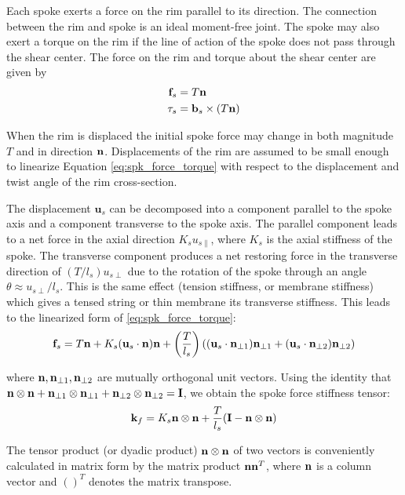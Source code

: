 \documentclass[\rootdir/thesis.tex]{subfiles}
\begin{document}
Each spoke exerts a force on the rim parallel to its direction. The connection between the rim and spoke is an ideal moment-free joint. The spoke may also exert a torque on the rim if the line of action of the spoke does not pass through the shear center. The force on the rim and torque about the shear center are given by
\begin{subequations}
\label{eq:spk_force_torque}
\begin{align}
\mathbf{f}_s &= T\mathbf{n}\\
\tau_s &= \mathbf{b}_s \times ( T\mathbf{n} )
\end{align}
\end{subequations}

When the rim is displaced the initial spoke force may change in both magnitude $T$ and in direction $\mathbf{n}$. Displacements of the rim are assumed to be small enough to linearize Equation \eqref{eq:spk_force_torque} with respect to the displacement and twist angle of the rim cross-section.

The displacement $\mathbf{u}_s$ can be decomposed into a component parallel to the spoke axis and a component transverse to the spoke axis. The parallel component leads to a net force in the axial direction $K_s u_{s\parallel}$, where $K_s$ is the axial stiffness of the spoke. The transverse component produces a net restoring force in the transverse direction of $(T/l_s) u_{s\perp}$ due to the rotation of the spoke through an angle $\theta \approx u_{s\perp}/l_s$. This is the same effect (tension stiffness, or membrane stiffness) which gives a tensed string or thin membrane its transverse stiffness. This leads to the linearized form of \eqref{eq:spk_force_torque}:
\begin{equation}
\label{eq:fs_us}
\mathbf{f}_s = T\mathbf{n} +
    K_s (\mathbf{u}_s \cdot \mathbf{n})\mathbf{n} +
    \left(\frac{T}{l_s}\right) \left((\mathbf{u}_s \cdot \mathbf{n}_{\perp 1} ) \mathbf{n}_{\perp 1} +
                                     (\mathbf{u}_s \cdot \mathbf{n}_{\perp 2} ) \mathbf{n}_{\perp 2} \right)
\end{equation}

where $\mathbf{n},\mathbf{n}_{\perp 1},\mathbf{n}_{\perp 2}$ are mutually orthogonal unit vectors. Using the identity that $\mathbf{n}\otimes\mathbf{n} + \mathbf{n}_{\perp 1}\otimes\mathbf{n}_{\perp 1} + \mathbf{n}_{\perp 2}\otimes\mathbf{n}_{\perp 2} = \mathbf{I}$, we obtain the spoke force stiffness tensor:
\begin{equation}
\label{eq:kf}
\mathbf{k}_f = K_s \mathbf{n}\otimes\mathbf{n} + \frac{T}{l_s}(\mathbf{I} - \mathbf{n}\otimes\mathbf{n})
\end{equation}

The tensor product (or dyadic product) $\mathbf{n}\otimes\mathbf{n}$ of two vectors is conveniently calculated in matrix form by the matrix product $\mathbf{n}\mathbf{n}^T$, where $\mathbf{n}$ is a column vector  and $()^T$ denotes the matrix transpose.
\end{document}
